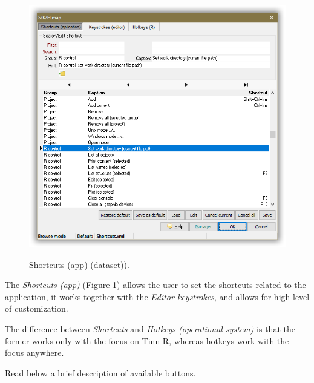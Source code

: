 \begin{figure}[H]
  \begin{center}
    \includegraphics[scale=0.40]{./res/dlg_skh_map_shortcuts.png}\\
  \end{center}
  \caption{Shortcuts (app) (dataset)).}
  \label{fig:dlg_shortcuts}
\end{figure}
The \textit{Shortcuts (app)}
(Figure \ref{fig:dlg_shortcuts})
allows the user to set the shortcuts related
to the application, it works together with the \textit{Editor keystrokes},
and allows for high level of customization.

The difference between \textit{Shortcuts} and \textit{Hotkeys (operational system)}
is that the former works only with the focus on Tinn-R, whereas hotkeys work
with the focus anywhere.

Read below a brief description of available buttons.

